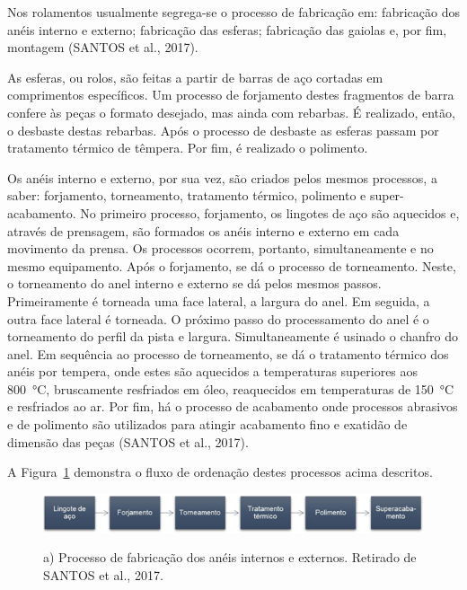 \documentclass[
	12pt,				
	oneside,			
	a4paper,			
	english,			
	brazil,			
	]{abntex2ppgsi}
\begin{document}
Nos rolamentos usualmente segrega-se o processo de fabricação em: fabricação dos anéis interno e externo; fabricação das esferas; fabricação das gaiolas e, por fim, montagem (SANTOS et al., 2017).   

As esferas, ou rolos, são feitas a partir de barras de aço cortadas em comprimentos específicos. Um processo de forjamento destes fragmentos de barra confere às peças o formato desejado, mas ainda com rebarbas. É realizado, então, o desbaste destas rebarbas. Após o processo de desbaste as esferas passam por tratamento térmico de têmpera. Por fim, é realizado o polimento. 

Os anéis interno e externo, por sua vez, são criados pelos mesmos processos, a saber: forjamento, torneamento, tratamento térmico, polimento e super-acabamento. No  primeiro processo, forjamento, os lingotes de aço são aquecidos e, através de prensagem, são formados os anéis interno e externo em cada movimento da prensa. Os processos ocorrem, portanto, simultaneamente e no mesmo equipamento. Após o forjamento, se dá o processo de torneamento. Neste, o torneamento do anel interno e externo se dá pelos mesmos passos. Primeiramente é torneada uma face lateral, a largura do anel. Em seguida, a outra face lateral é torneada. O próximo passo do processamento do anel é o torneamento do perfil da pista e largura. Simultaneamente é usinado o chanfro do anel. Em sequência ao processo de torneamento, se dá o tratamento térmico dos anéis por tempera, onde estes são aquecidos a temperaturas superiores aos \SI{800}{\celsius}, bruscamente resfriados em óleo, reaquecidos em temperaturas de \SI{150}{\celsius} e resfriados ao ar. Por fim, há o processo de acabamento onde processos abrasivos e de polimento são utilizados para atingir acabamento fino e exatidão de dimensão das peças (SANTOS et al., 2017). 


A Figura~\ref{FiguraProcessoFabricacao} demonstra o fluxo de ordenação destes processos acima descritos.
\begin{figure}[!htb]
\centering
\caption{a) Processo de fabricação dos anéis internos e externos. Retirado de SANTOS et al., 2017.}
\includegraphics[width=\textwidth,height=\textheight,keepaspectratio]{Figura2}
\label{FiguraProcessoFabricacao}
\end{figure}
\end{document}
